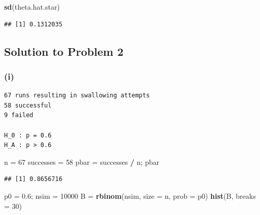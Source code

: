 \documentclass[]{article}
\newenvironment{Shaded}{\begin{snugshade}}{\end{snugshade}}
\newcommand{\DataTypeTok}[1]{\textcolor[rgb]{0.13,0.29,0.53}{#1}}
\newcommand{\DecValTok}[1]{\textcolor[rgb]{0.00,0.00,0.81}{#1}}
\newcommand{\FloatTok}[1]{\textcolor[rgb]{0.00,0.00,0.81}{#1}}
\newcommand{\KeywordTok}[1]{\textcolor[rgb]{0.13,0.29,0.53}{\textbf{#1}}}
\newcommand{\NormalTok}[1]{#1}
\newcommand{\OperatorTok}[1]{\textcolor[rgb]{0.81,0.36,0.00}{\textbf{#1}}}
\newcommand{\StringTok}[1]{\textcolor[rgb]{0.31,0.60,0.02}{#1}}
\begin{document}
\begin{Shaded}
\begin{Highlighting}[]
\KeywordTok{sd}\NormalTok{(theta.hat.star)}
\end{Highlighting}
\end{Shaded}

\begin{verbatim}
## [1] 0.1312035
\end{verbatim}

\hypertarget{solution-to-problem-2}{%
\subsection{Solution to Problem 2}\label{solution-to-problem-2}}

\hypertarget{i-1}{%
\subsubsection{(i)}\label{i-1}}

\begin{verbatim}
67 runs resulting in swallowing attempts
58 successful
9 failed

H_0 : p = 0.6
H_A : p > 0.6

\end{verbatim}

\begin{Shaded}
\begin{Highlighting}[]
\NormalTok{n =}\StringTok{ }\DecValTok{67}
\NormalTok{successes =}\StringTok{ }\DecValTok{58}
\NormalTok{pbar =}\StringTok{ }\NormalTok{successes }\OperatorTok{/}\StringTok{ }\NormalTok{n; pbar}
\end{Highlighting}
\end{Shaded}

\begin{verbatim}
## [1] 0.8656716
\end{verbatim}

\begin{Shaded}
\begin{Highlighting}[]
\NormalTok{p0 =}\StringTok{ }\FloatTok{0.6}\NormalTok{; nsim =}\StringTok{ }\DecValTok{10000}
\NormalTok{B =}\StringTok{ }\KeywordTok{rbinom}\NormalTok{(nsim, }\DataTypeTok{size =}\NormalTok{ n, }\DataTypeTok{prob =}\NormalTok{ p0)}
\KeywordTok{hist}\NormalTok{(B, }\DataTypeTok{breaks =} \DecValTok{30}\NormalTok{)}
\end{Highlighting}
\end{Shaded}
\end{document}
